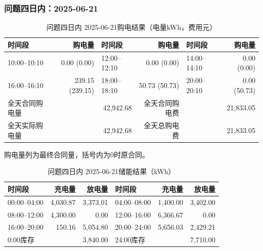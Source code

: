 \par\medskip
\par\noindent\begin{minipage}{\textwidth}
\subsubsection*{问题四日内：2025-06-21}
\begin{table}[H]\centering\small\setlength{\tabcolsep}{4pt}\caption{问题四日内 2025-06-21购电结果（电量kWh，费用元）}
\begin{tabular}{lr lr lr}\toprule
时间段 & 购电量 & 时间段 & 购电量 & 时间段 & 购电量\\\midrule
10:00--10:10 & 0.00 (0.00) & 12:00--12:10 & 0.00 (0.00) & 14:00--14:10 & 0.00 (0.00)\\
16:00--16:10 & 239.15 (239.15) & 18:00--18:10 & 50.73 (50.73) & 20:00--20:10 & 0.00 (50.73)\\
\midrule
全天合同购电量 & \multicolumn{2}{r}{42,942.68} & 全天合同购电费 & \multicolumn{2}{r}{21,833.05}\\
全天实际购电量 & \multicolumn{2}{r}{42,942.68} & 全天总购电费 & \multicolumn{2}{r}{21,833.05}\\
\bottomrule\end{tabular}\end{table}
\noindent\small 购电量列为最终合同量，括号内为0时原合同。\normalsize
\begin{table}[H]\centering\small\setlength{\tabcolsep}{4pt}\caption{问题四日内 2025-06-21储能结果（kWh）}
\begin{tabular}{lrr lrr}\toprule
时间段 & 充电量 & 放电量 & 时间段 & 充电量 & 放电量\\\midrule
00:00--04:00 & 4,030.87 & 3,373.01 & 04:00--08:00 & 1,400.00 & 3,402.00\\
08:00--12:00 & 4,300.00 & 0.00 & 12:00--16:00 & 6,366.67 & 0.00\\
16:00--20:00 & 150.16 & 5,054.80 & 20:00--24:00 & 5,656.03 & 2,429.21\\
\midrule
0:00库存 & \multicolumn{2}{r}{3,840.00} & 24:00库存 & \multicolumn{2}{r}{7,710.00}\\
\bottomrule\end{tabular}\end{table}
\end{minipage}\par

